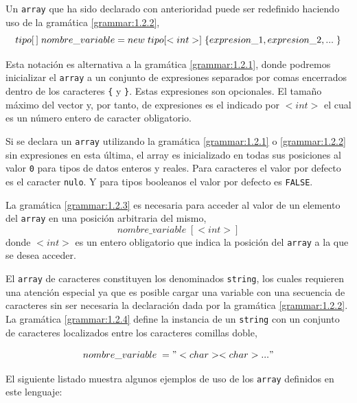 \documentclass[11pt, english]{article}
\begin{document}
	Un \texttt{array} que ha sido declarado con anterioridad puede ser redefinido haciendo uso de la gramática \ref{grammar:1.2.2},
	\begin{equation}\label{grammar:1.2.2}
	tipo[ \, ]\; nombre\_variable = new\; tipo[<int>]\; \{ \\
	expresion\_1, expresion\_2, ...\;\}
	\end{equation}
	
	Esta notación es alternativa a la gramática \ref{grammar:1.2.1}, donde podremos inicializar el \texttt{array} a un conjunto de expresiones separados por comas encerrados dentro de los caracteres \texttt{\{} y \texttt{\}}. Estas expresiones son opcionales. El tamaño máximo del vector y, por tanto, de expresiones es el indicado por $<int>$ el cual es un número entero de caracter obligatorio.
	
	Si se declara un \texttt{array} utilizando la gramática \ref{grammar:1.2.1} o \ref{grammar:1.2.2} sin expresiones en esta última, el array es inicializado en todas sus posiciones al valor \texttt{0} para tipos de datos enteros y reales. Para caracteres el valor por defecto es el caracter \texttt{nulo}. Y para tipos booleanos el valor por defecto es \texttt{FALSE}.
	
	La gramática \ref{grammar:1.2.3} es necesaria para acceder al valor de un elemento del \texttt{array} en una posición arbitraria del mismo,
	\begin{equation}\label{grammar:1.2.3}
	nombre\_variable\; [<int>]
	\end{equation}
	donde $<int>$ es un entero obligatorio que indica la posición del \texttt{array} a la que se desea acceder.
	
	El \texttt{array} de caracteres constituyen los denominados \texttt{string}, los cuales requieren una atención especial ya que es posible cargar una variable con una secuencia de caracteres sin ser necesaria la declaración dada por la gramática \ref{grammar:1.2.2}. La gramática \ref{grammar:1.2.4} define la instancia de un \texttt{string} con un conjunto de caracteres localizados entre los caracteres comillas doble,
	
	\begin{equation}\label{grammar:1.2.4}
	nombre\_variable\; = " <char><char>..."
	\end{equation}
	
	El siguiente listado muestra algunos ejemplos de uso de los \texttt{array} definidos en este lenguaje:
	
	
	
\end{document}
